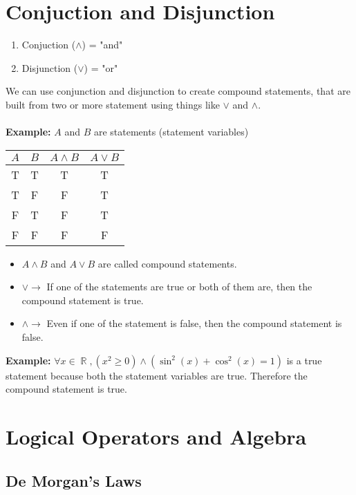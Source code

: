 \documentclass[11pt, a4paper]{memoir}
\DeclareMathOperator{\R}{{\mathbb{R}}}
\theoremstyle{change}
\theoremstyle{plain}
\theoremstyle{nonumberplain}
\numberwithin{equation}{section}
\begin{document}
\section{Conjuction and Disjunction}
\begin{enumerate}
    \item Conjuction ($\wedge$) = "and"
    \item Disjunction ($\vee$) = "or"
\end{enumerate}
We can use conjunction and disjunction to create compound statements, that are built from two or more statement using
things like $\vee$ and $\wedge$. \\ \: \\
\textbf{Example:} $A$ and $B$ are statements (statement variables)

\begin{table}[ht]
    \centering
    \begin{tabular}{|c|c|c|c|}
        \hline
        $A$ & $B$ & $A \wedge B$ & $A \vee B$ \\
        \hline
        T & T & T & T \\
        \hline
        T & F & F & T \\
        \hline
        F & T & F & T \\
        \hline 
        F & F & F & F \\ 
        \hline
    \end{tabular}
    \end{table}

\begin{itemize}
    \item $A \wedge B$ and $A \vee B$ are called compound statements.
    \item $\vee \to $ If one of the statements are true or both of them are, then the compound statement is true.
    \item $\wedge \to $ Even if one of the statement is false, then the compound statement is false.
\end{itemize}
\textbf{Example:} $\forall x \in \R, (x^2 \ge 0) \wedge (\sin^2(x) + \cos^2(x) = 1)$ is a true statement because both the statement variables are true. Therefore the compound statement is true.

\section{Logical Operators and Algebra}
\subsection{De Morgan's Laws}
\end{document}
